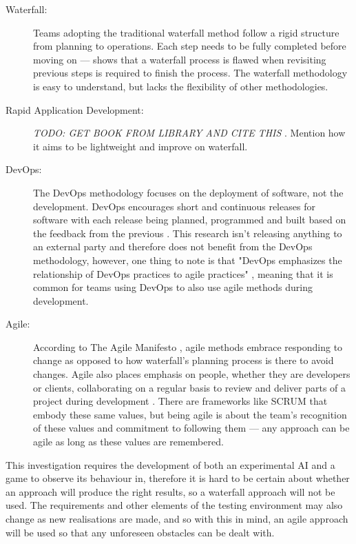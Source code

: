 \documentclass[11pt, a4paper]{report}
\begin{document}
\begin{description}

  \item[Waterfall:] Teams adopting the traditional waterfall method follow a rigid structure from planning to operations. Each step needs to be fully completed before moving on --- \citeauthor{royce1987managing} \parencite*[330]{royce1987managing} shows that a waterfall process is flawed when revisiting previous steps is required to finish the process. The waterfall methodology is easy to understand, but lacks the flexibility of other methodologies.
   
  \item[Rapid Application Development:] \emph{TODO: GET BOOK FROM LIBRARY AND CITE THIS} \parencite{martin1991rapid}. Mention how it aims to be lightweight and improve on waterfall.
   
  \item[DevOps:] The DevOps methodology focuses on the deployment of software, not the development. DevOps encourages short and continuous releases for software with each release being planned, programmed and built based on the feedback from the previous \parencite{bass2015devops}. This research isn't releasing anything to an external party and therefore does not benefit from the DevOps methodology, however, one thing to note is that "DevOps emphasizes the relationship of DevOps practices to agile practices" \parencite[15]{bass2015devops}, meaning that it is common for teams using DevOps to also use agile methods during development.

  \item[Agile:] According to The Agile Manifesto \parencite[2]{fowler2001agile}, agile methods embrace responding to change as opposed to how waterfall's planning process is there to avoid changes. Agile also places emphasis on people, whether they are developers or clients, collaborating on a regular basis to review and deliver parts of a project during development \parencite[3]{fowler2001agile}. There are frameworks like SCRUM \parencite[1]{fowler2001agile} that embody these same values, but being agile is about the team's recognition of these values and commitment to following them --- any approach can be agile as long as these values are remembered.

\end{description}

This investigation requires the development of both an experimental AI and a game to observe its behaviour in, therefore it is hard to be certain about whether an approach will produce the right results, so a waterfall approach will not be used. The requirements and other elements of the testing environment may also change as new realisations are made, and so with this in mind, an agile approach will be used so that any unforeseen obstacles can be dealt with.
\end{document}
